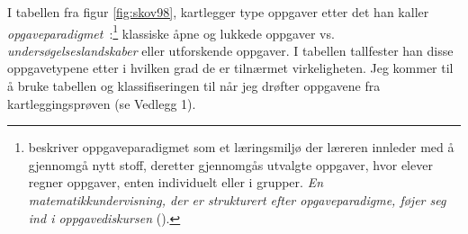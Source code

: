 \documentclass[main.tex]{subfiles}
\begin{document}
I tabellen fra figur \ref{fig:skov98}, kartlegger  type oppgaver etter det han kaller 
\mbox{\emph{opgaveparadigmet} :}\footnote[2]{ beskriver oppgaveparadigmet som et læringsmiljø der læreren 
innleder med å gjennomgå nytt stoff, deretter gjennomgås utvalgte oppgaver, hvor elever regner oppgaver, enten 
individuelt eller i grupper. \emph{En matematikkundervisning, der er strukturert efter opgaveparadigme, føjer seg ind i 
\guillemotleft oppgavediskursen\guillemotright} ().} klassiske åpne og lukkede oppgaver vs. 
\emph{undersøgelseslandskaber} eller utforskende oppgaver. I tabellen tallfester han disse oppgavetypene etter i hvilken 
grad de er tilnærmet virkeligheten. Jeg kommer til å bruke tabellen og klassifiseringen til  når 
jeg drøfter oppgavene fra kartleggingsprøven (se Vedlegg 1). 
\end{document}
